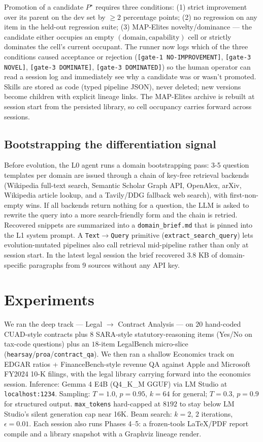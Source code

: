 \documentclass[11pt,a4paper]{article}
\begin{document}
Promotion of a candidate $P^\star$ requires three conditions: (1) strict improvement over its parent on the dev set by $\geq 2$ percentage points; (2) no regression on any item in the held-out regression suite; (3) MAP-Elites novelty/dominance --- the candidate either occupies an empty $(\text{domain}, \text{capability})$ cell or strictly dominates the cell's current occupant. The runner now logs which of the three conditions caused acceptance or rejection (\texttt{[gate-1 NO-IMPROVEMENT]}, \texttt{[gate-3 NOVEL]}, \texttt{[gate-3 DOMINATE]}, \texttt{[gate-3 DOMINATED]}) so the human operator can read a session log and immediately see why a candidate was or wasn't promoted. Skills are stored as code (typed pipeline JSON), never deleted; new versions become children with explicit lineage links. The MAP-Elites archive is rebuilt at session start from the persisted library, so cell occupancy carries forward across sessions.

\subsection{Bootstrapping the differentiation signal}

Before evolution, the L0 agent runs a domain bootstrapping pass: 3-5 question templates per domain are issued through a chain of key-free retrieval backends (Wikipedia full-text search, Semantic Scholar Graph API, OpenAlex, arXiv, Wikipedia article lookup, and a Tavily/DDG fallback web search), with first-non-empty wins. If all backends return nothing for a question, the LLM is asked to rewrite the query into a more search-friendly form and the chain is retried. Recovered snippets are summarized into a \texttt{domain\_brief.md} that is pinned into the L1 system prompt. A \texttt{Text}$\to$\texttt{Query} primitive (\texttt{extract\_search\_query}) lets evolution-mutated pipelines also call retrieval mid-pipeline rather than only at session start. In the latest legal session the brief recovered 3.8 KB of domain-specific paragraphs from 9 sources without any API key.

\section{Experiments}

We ran the deep track --- Legal $\rightarrow$ Contract Analysis --- on $20$ hand-coded CUAD-style contracts plus $8$ SARA-style statutory-reasoning items (Yes/No on tax-code questions) plus an $18$-item LegalBench micro-slice (\texttt{hearsay}/\texttt{proa}/\texttt{contract\_qa}). We then ran a shallow Economics track on EDGAR ratios + FinanceBench-style revenue QA against Apple and Microsoft FY2024 10-K filings, with the legal library carrying forward into the economics session. Inference: Gemma 4 E4B (Q4\_K\_M GGUF) via LM Studio at \texttt{localhost:1234}. Sampling: $T=1.0$, $p=0.95$, $k=64$ for general; $T=0.3$, $p=0.9$ for structured output. \texttt{max\_tokens} hard-capped at $8192$ to stay below LM Studio's silent generation cap near 16K. Beam search: $k=2$, $2$ iterations, $\epsilon=0.01$. Each session also runs Phases 4--5: a frozen-tools LaTeX/PDF report compile and a library snapshot with a Graphviz lineage render.
\end{document}
